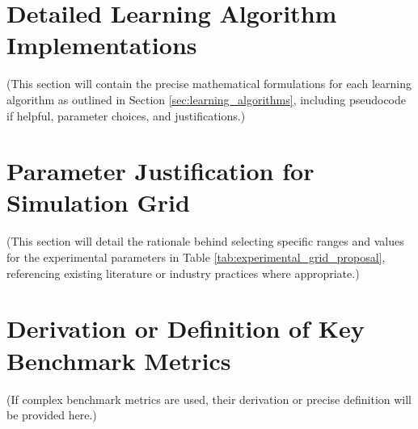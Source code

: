 \documentclass[12pt, a4paper]{article}
\begin{document}
\appendix
\section{Detailed Learning Algorithm Implementations} \label{app:learning_algo_details}
(This section will contain the precise mathematical formulations for each learning algorithm as outlined in Section \ref{sec:learning_algorithms}, including pseudocode if helpful, parameter choices, and justifications.)

\section{Parameter Justification for Simulation Grid}
(This section will detail the rationale behind selecting specific ranges and values for the experimental parameters in Table \ref{tab:experimental_grid_proposal}, referencing existing literature or industry practices where appropriate.)

\section{Derivation or Definition of Key Benchmark Metrics}
(If complex benchmark metrics are used, their derivation or precise definition will be provided here.)
\end{document}
